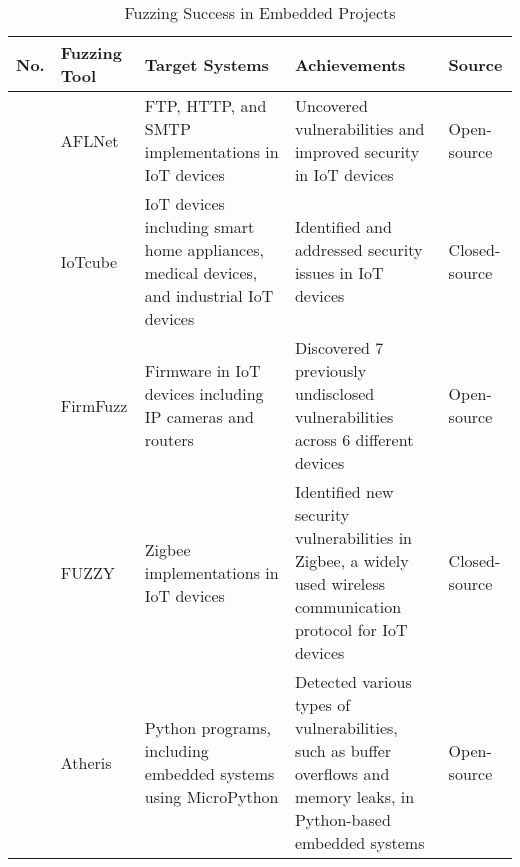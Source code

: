 \begin{table}[h!]
\centering
\begin{tabularx}{\textwidth}{@{}>{\raggedright\arraybackslash}p{0.5cm}>{\raggedright\arraybackslash}p{1.5cm}>{\raggedright\arraybackslash}p{3.8cm}X>{\raggedright\arraybackslash}p{1.2cm}@{}}
\toprule
\textbf{No.} & \textbf{Fuzzing Tool} & \textbf{Target Systems} & \textbf{Achievements} & \textbf{Source} \\
\midrule
1 & AFLNet & FTP, HTTP, and SMTP implementations in IoT devices & Uncovered vulnerabilities and improved security in IoT devices\cite{lin2020aflnet} & Open-source \\
\addlinespace
2 & IoTcube & IoT devices including smart home appliances, medical devices, and industrial IoT devices & Identified and addressed security issues in IoT devices\cite{kim2019iotcube} & Closed-source \\
\addlinespace
3 & FirmFuzz & Firmware in IoT devices including IP cameras and routers & Discovered 7 previously undisclosed vulnerabilities across 6 different devices\cite{srivastava2019firmfuzz} & Open-source \\
\addlinespace
4 & FUZZY & Zigbee implementations in IoT devices & Identified new security vulnerabilities in Zigbee, a widely used wireless communication protocol for IoT devices\cite{vidas2019fuzzy} & Closed-source \\
\addlinespace
5 & Atheris & Python programs, including embedded systems using MicroPython & Detected various types of vulnerabilities, such as buffer overflows and memory leaks, in Python-based embedded systems\cite{atheris2020} & Open-source \\
\bottomrule
\end{tabularx}
\caption{Fuzzing Success in Embedded Projects}
\label{tab:embedded_fuzzing_success}
\end{table}

\clearpage